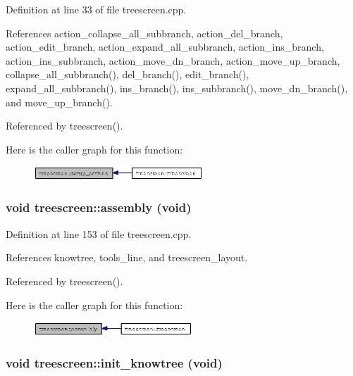 Definition at line 33 of file treescreen.cpp.

References action\_\-collapse\_\-all\_\-subbranch, action\_\-del\_\-branch, action\_\-edit\_\-branch, action\_\-expand\_\-all\_\-subbranch, action\_\-ins\_\-branch, action\_\-ins\_\-subbranch, action\_\-move\_\-dn\_\-branch, action\_\-move\_\-up\_\-branch, collapse\_\-all\_\-subbranch(), del\_\-branch(), edit\_\-branch(), expand\_\-all\_\-subbranch(), ins\_\-branch(), ins\_\-subbranch(), move\_\-dn\_\-branch(), and move\_\-up\_\-branch().

Referenced by treescreen().

Here is the caller graph for this function:\begin{figure}[H]
\begin{center}
\leavevmode
\includegraphics[width=180pt]{classtreescreen_a6e4728a4524289c2e933abc51d9cb20_icgraph}
\end{center}
\end{figure}
\subsubsection{\setlength{\rightskip}{0pt plus 5cm}void treescreen::assembly (void)\hspace{0.3cm}{\tt  [private]}}\label{classtreescreen_8e899dee280df6b59f982726e4bed7d9}




Definition at line 153 of file treescreen.cpp.

References knowtree, tools\_\-line, and treescreen\_\-layout.

Referenced by treescreen().

Here is the caller graph for this function:\begin{figure}[H]
\begin{center}
\leavevmode
\includegraphics[width=169pt]{classtreescreen_8e899dee280df6b59f982726e4bed7d9_icgraph}
\end{center}
\end{figure}
\subsubsection{\setlength{\rightskip}{0pt plus 5cm}void treescreen::init\_\-knowtree (void)\hspace{0.3cm}{\tt  [private]}}\label{classtreescreen_d325ba7cf9bd91d3e511aa2a5374293c}




